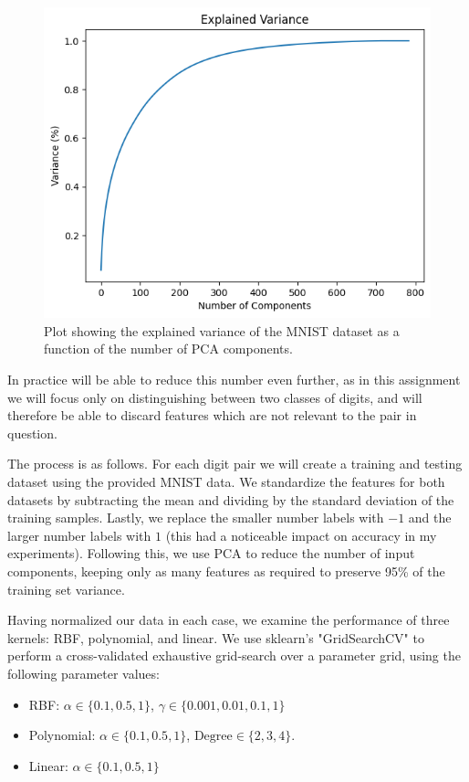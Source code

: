 \documentclass[12pt,a4paper]{article}
\theoremstyle{definition}
\theoremstyle{remark}
\begin{document}
\begin{figure}[h]
    \centering
    \includegraphics{PCA_Var.png}
    \caption{Plot showing the explained variance of the MNIST dataset as a function of the number of PCA components.}
    \label{fig:fig1}
\end{figure}


In practice will be able to reduce this number even further, as in this assignment we will focus only on distinguishing between two classes of digits, and will therefore be able to discard features which are not relevant to the pair in question. 

The process is as follows. For each digit pair we will create a training and testing dataset using the provided MNIST data. We standardize the features for both datasets by subtracting the mean and dividing by the standard deviation of the training samples. Lastly, we replace the smaller number labels with $-1$ and the larger number labels with $1$ (this had a noticeable impact on accuracy in my experiments). Following this, we use PCA to reduce the number of input components, keeping only as many features as required to preserve 95\% of the training set variance. 

Having normalized our data in each case, we examine the performance of three kernels: RBF, polynomial, and linear. We use sklearn's "GridSearchCV" to perform a cross-validated exhaustive grid-search over a parameter grid, using the following parameter values:

\begin{itemize}
    \item RBF: $\alpha \in \{0.1, 0.5, 1\}$, $\gamma \in \{0.001, 0.01, 0.1, 1\}$
    \item Polynomial: $\alpha \in \{0.1, 0.5, 1\}$, $\text{Degree} \in \{2, 3, 4\}$. 
    \item Linear: $\alpha \in \{0.1, 0.5, 1\}$
\end{itemize}
\end{document}

